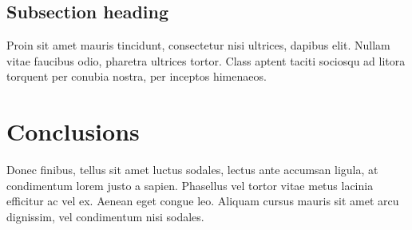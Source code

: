 \documentclass[12pt, twocolumn]{revtex4}    %
\begin{document}
\subsection{Subsection heading}

Proin sit amet mauris tincidunt, consectetur nisi ultrices, dapibus elit. Nullam vitae faucibus odio, pharetra ultrices tortor. Class aptent taciti sociosqu ad litora torquent per conubia nostra, per inceptos himenaeos. 

\section{Conclusions}
Donec finibus, tellus sit amet luctus sodales, lectus ante accumsan ligula, at condimentum lorem justo a sapien. Phasellus vel tortor vitae metus lacinia efficitur ac vel ex. Aenean eget congue leo. Aliquam cursus mauris sit amet arcu dignissim, vel condimentum nisi sodales. 



\end{document}

